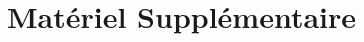 \documentclass[titlepage,\numsides,openright,letterpaper,12pt]{book}
\begin{document}

\singlespacing

\appendix
\renewcommand\chapterstring{Annexe}
\chapter{Matériel Supplémentaire}



\end{document}
